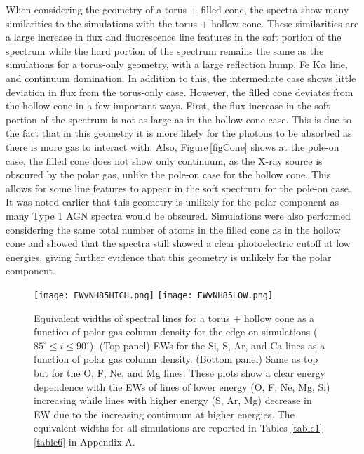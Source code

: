 \documentclass[fleqn,usenatbib]{mnras}
\begin{document}
        When considering the geometry of a torus + filled cone, the spectra show many similarities to the simulations with the torus + hollow cone. These similarities are a large increase in flux and fluorescence line features in the soft portion of the spectrum while the hard portion of the spectrum remains the same as the simulations for a torus-only geometry, with a large reflection hump, Fe K$\alpha$ line, and continuum domination. In addition to this, the intermediate case shows little deviation in flux from the torus-only case. However, the filled cone deviates from the hollow cone in a few important ways. First, the flux increase in the soft portion of the spectrum is not as large as in the hollow cone case. This is due to the fact that in this geometry it is more likely for the photons to be absorbed as there is more gas to interact with. Also, Figure\,\ref{figCone} shows at the pole-on case, the filled cone does not show only continuum, as the X-ray source is obscured by the polar gas, unlike the pole-on case for the hollow cone. This allows for some line features to appear in the soft spectrum for the pole-on case. It was noted earlier that this geometry is unlikely for the polar component as many Type 1 AGN spectra would be obscured. Simulations were also performed considering the same total number of atoms in the filled cone as in the hollow cone and showed that the spectra still showed a clear photoelectric cutoff at low energies, giving further evidence that this geometry is unlikely for the polar component.  
        
        \begin{figure}
            \centering
            \texttt{[image: EWvNH85HIGH.png]}
            \texttt{[image: EWvNH85LOW.png]}
            \caption{Equivalent widths of spectral lines for a torus + hollow cone as a function of polar gas column density for the edge-on simulations ($85^{\circ} \leq i \leq 90^{\circ}$). (Top panel) EWs for the Si, S, Ar, and Ca lines as a function of polar gas column density. (Bottom panel) Same as top but for the O, F, Ne, and Mg lines. These plots show a clear energy dependence with the EWs of lines of lower energy (O, F, Ne, Mg, Si) increasing while lines with higher energy (S, Ar, Mg) decrease in EW due to the increasing continuum at higher energies. The equivalent widths for all simulations are reported in Tables \ref{table1}-\ref{table6} in Appendix A.}
            \label{fig6}
        \end{figure} 
        
\end{document}
